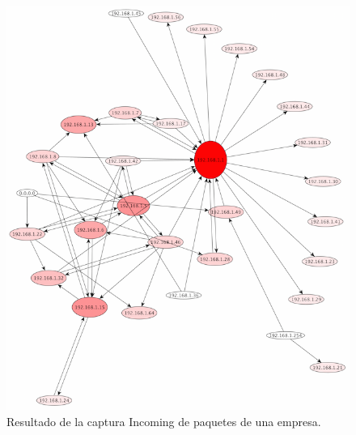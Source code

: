 \documentclass[10pt, a4paper]{article}
\begin{document}
\begin{figure}[H] %
\begin{center}
\includegraphics[width=400pt]{../imgs/tiarg-incoming.png}
\caption{Resultado de la captura Incoming de paquetes de una empresa.}
\end{center}
\end{figure}
\end{document}
